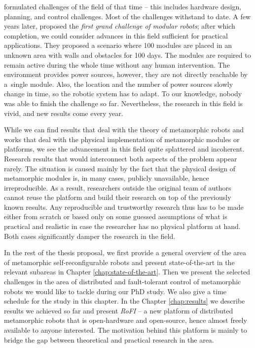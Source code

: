 \textcite{4141032} formulated challenges of the field of that time -- this
includes hardware design, planning, and control challenges. Most of the
challenges withstand to date. A few years later,
\textcite{DBLP:journals/corr/abs-1108-5543} proposed the \emph{first grand
challenge of modular robots}; after which completion, we could consider advances
in this field sufficient for practical applications. They proposed a scenario
where 100 modules are placed in an unknown area with walls and obstacles for 100
days. The modules are required to remain active during the whole time without
any human intervention. The environment provides power sources, however, they
are not directly reachable by a~single module. Also, the location and the number
of power sources slowly change in time, so the robotic system has to adapt. To
our knowledge, nobody was able to finish the challenge so far. Nevertheless, the
research in this field is vivid, and new results come every year.

While we can find results that deal with the theory of metamorphic robots and
works that deal with the physical implementation of metamorphic modules or
platforms, we see the advancement in this field quite splattered and incoherent.
Research results that would interconnect both aspects of the problem appear
rarely. The situation is caused mainly by the fact that the physical design of
metamorphic modules is, in many cases, publicly unavailable, hence
irreproducible. As a result, researchers outside the original team of authors
cannot reuse the platform and build their research on top of the previously
known results.  Any reproducible and trustworthy research thus has to be made
either from scratch or based only on some guessed assumptions of what is
practical and realistic in case the researcher has no physical platform at hand.
Both cases significantly damper the research in the field.

In the rest of the thesis proposal, we first provide a general overview of the
area of metamorphic self-reconfigurable robots and present state-of-the-art in
the relevant subareas in Chapter \ref{chap:state-of-the-art}. Then we present
the selected challenges in the area of distributed and fault-tolerant control of
metamorphic robots we would like to tackle during our PhD study. We also give a
time schedule for the study in this chapter. In the Chapter \ref{chap:results}
we describe results we achieved so far and present \emph{RoFI} -- a new platform
of distributed metamorphic robots that is open-hardware and open-source, hence
almost freely available to anyone interested. The motivation behind this
platform is mainly to bridge the gap between theoretical and practical research
in the area.
